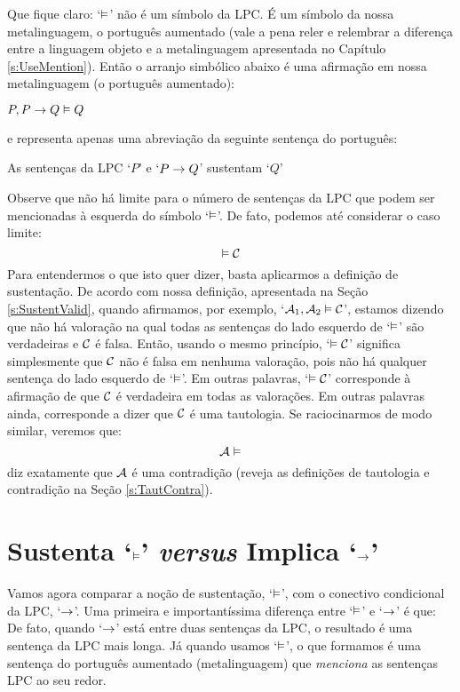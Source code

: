 Que fique claro: `$\vDash$' não é um símbolo da LPC.
É um símbolo da nossa metalinguagem, o português aumentado (vale a pena reler e relembrar a diferença entre a linguagem objeto e a metalinguagem apresentada no Capítulo  \ref{s:UseMention}).
Então o arranjo simbólico abaixo é uma afirmação em nossa metalinguagem (o português aumentado):
	\begin{ebullet}
		\item $P, P \rightarrow Q \vDash Q$
	\end{ebullet}
e representa apenas uma abreviação da seguinte sentença do português:
	\begin{ebullet}
		\item As sentenças da LPC `$P$' e `$P \rightarrow Q$' sustentam `$Q$'
	\end{ebullet}
Observe que não há limite para o número de sentenças da LPC que podem ser mencionadas à esquerda do símbolo `$\vDash$'.
De fato, podemos até considerar o caso limite:
	$$\vDash \mathcal{C}$$
Para entendermos o que isto quer dizer, basta aplicarmos a definição de sustentação.
De acordo com nossa definição, apresentada na Seção \ref{s:SustentValid}, quando afirmamos, por exemplo, `$\mathcal{A}_1, \mathcal{A}_2 \vDash \mathcal{C}$', estamos dizendo que não há valoração na qual todas as sentenças do lado esquerdo de `$\vDash$' são verdadeiras e $\mathcal{C}$ é falsa.
Então, usando o mesmo princípio, `$\vDash \mathcal{C}$' significa simplesmente que $\mathcal{C}$ não é falsa em nenhuma valoração, pois não há qualquer sentença do lado  esquerdo de `$\vDash$'.
Em outras palavras, `$\vDash \mathcal{C}$' corresponde à afirmação de que $\mathcal{C}$ é verdadeira em todas as valorações.
Em outras palavras ainda, corresponde a dizer que $\mathcal{C}$ é uma tautologia.
Se raciocinarmos de modo similar, veremos que:
	$$\mathcal{A} \vDash$$
diz exatamente que $\mathcal{A}$ é uma contradição (reveja as definições de tautologia e contradição na Seção \ref{s:TautContra}).


\section[Sustenta \emph{versus} implica]{Sustenta `$\vDash$' \emph{versus} Implica `$\rightarrow$'}\label{s:SustVsCond}
Vamos agora comparar a noção de sustentação, `$\vDash$', com o conectivo condicional da LPC, `$\rightarrow$'.
Uma primeira e importantíssima diferença entre `$\vDash$' e `$\rightarrow$' é que:
{\small
	}
De fato, quando `$\rightarrow$' está entre duas sentenças da LPC, o resultado é uma sentença da LPC mais longa.
Já quando usamos `$\vDash$', o que formamos é uma sentença do português aumentado (metalinguagem) que \emph{menciona} as sentenças LPC ao seu redor.


